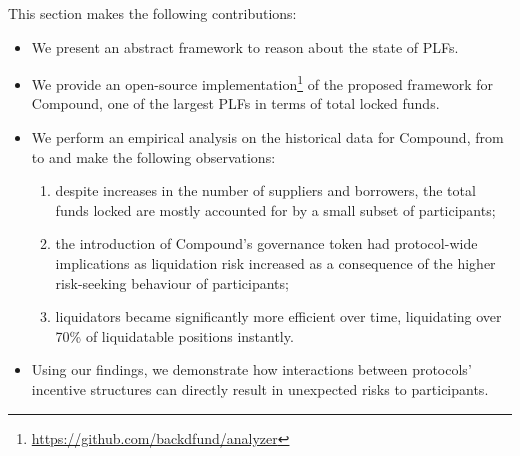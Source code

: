  This section makes the following contributions:
\begin{itemize}
    \item We present an abstract framework to reason about the state of PLFs.
    
    \item We provide an open-source implementation\footnote{\url{https://github.com/backdfund/analyzer}} of the proposed framework for Compound, one of the largest PLFs in terms of total locked funds.
    
    \item We perform an empirical analysis on the historical data for Compound, from \StartDate to \EndDate and make the following observations:
    \begin{enumerate}%
    \item despite increases in the number of suppliers and borrowers, the total funds locked are mostly accounted for by a small subset of participants; 
    \item the introduction of Compound's governance token had protocol-wide implications as liquidation risk increased as a consequence of the higher risk-seeking behaviour of participants;
    \item liquidators became significantly more efficient over time, liquidating over 70\% of liquidatable positions instantly.
    \end{enumerate}
    
    \item Using our findings, we demonstrate how interactions between protocols' incentive structures can directly result in unexpected risks to participants.
\end{itemize}
